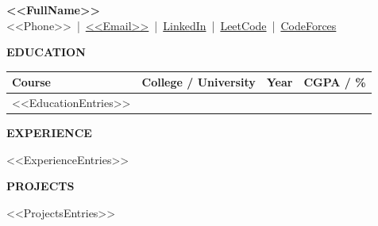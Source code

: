 \documentclass[11pt,article]{article}
\newcommand{\resheading}[1]{%
  \vspace{4pt}%
  {\small \colorbox{mygrey}{\begin{minipage}{0.99\textwidth}{\textbf{#1 \vphantom{p\^{E}}}}\end{minipage}}}%
  \vspace{2pt}%
}
\begin{document}
\noindent
\begin{minipage}[c]{0.12\textwidth}
    \rule{0pt}{0.7in}
\end{minipage}%
\begin{minipage}[c]{0.76\textwidth}
    \centering
    \textbf{\Huge <<FullName>>}\\[3pt]
    <<Phone>> \,|\,
    \href{mailto:<<Email>>}{<<Email>>} \,|\,
    \href{<<LinkedIn>>}{LinkedIn} \,|\,
    \href{<<LeetCode>>}{LeetCode} \,|\,
    \href{<<CodeForces>>}{CodeForces}
\end{minipage}%
\begin{minipage}[c]{0.12\textwidth}
    \hfill
\end{minipage}
\par\vspace{0pt}

\resheading{\textbf{EDUCATION}}

\renewcommand{\arraystretch}{1.15}
\setlength{\tabcolsep}{8pt}
\noindent\begin{tabularx}{\linewidth}{l X l l}
\textbf{Course}  & \textbf{College / University} & \textbf{Year} & \textbf{CGPA / \%} \\
\midrule
<<EducationEntries>>
\end{tabularx}


\resheading{\textbf{EXPERIENCE}}
\begin{itemize}
<<ExperienceEntries>>
\end{itemize}

\resheading{\textbf{PROJECTS}}

\begin{itemize}
<<ProjectsEntries>>
\end{itemize}
\end{document}

